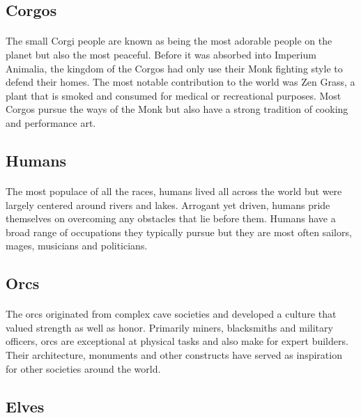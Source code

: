 \subsection{Corgos}

\paragraph{} The small Corgi people are known as being the most adorable people on the planet but also the most peaceful. Before it was absorbed into Imperium Animalia, the kingdom of the Corgos had only use their Monk fighting style to defend their homes. The most notable contribution to the world was Zen Grass, a plant that is smoked and consumed for medical or recreational purposes. Most Corgos pursue the ways of the Monk but also have a strong tradition of cooking and performance art.

\subsection{Humans}

\paragraph{} The most populace of all the races, humans lived all across the world but were largely centered around rivers and lakes. Arrogant yet driven, humans pride themselves on overcoming any obstacles that lie before them. Humans have a broad range of occupations they typically pursue but they are most often sailors, mages, musicians and politicians.

\subsection{Orcs}

\paragraph{} The orcs originated from complex cave societies and developed a culture that valued strength as well as honor. Primarily miners, blacksmiths and military officers, orcs are exceptional at physical tasks and also make for expert builders. Their architecture, monuments and other constructs have served as inspiration for other societies around the world.

\subsection{Elves}

